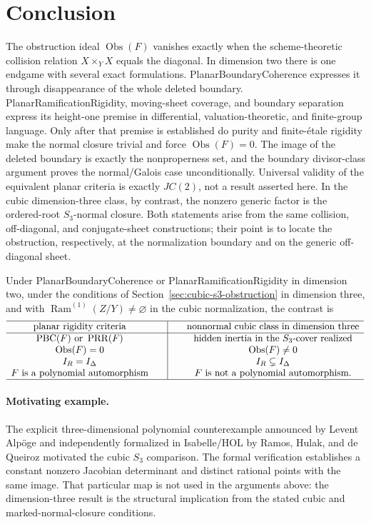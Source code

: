 \documentclass[11pt]{article}
\theoremstyle{remark}
\theoremstyle{definition}
\DeclareMathOperator{\Ram}{Ram}
\newcommand{\Obs}{\operatorname{Obs}}
\begin{document}
\section{Conclusion}
\label{sec:conclusion}

The obstruction ideal \(\Obs(F)\) vanishes exactly when the
scheme-theoretic collision relation \(X\times_YX\) equals the diagonal.
In dimension two there is one endgame with several exact formulations.
PlanarBoundaryCoherence expresses it through disappearance of the whole
deleted boundary.  PlanarRamificationRigidity, moving-sheet coverage, and
boundary separation express its height-one premise in differential,
valuation-theoretic, and finite-group language.  Only after that premise is
established do purity
and finite-\'etale rigidity make the normal closure trivial and force
\(\Obs(F)=0\).  The image of the deleted boundary is exactly the
nonproperness set, and the boundary divisor-class argument proves the
normal/Galois case unconditionally.  Universal validity of the equivalent
planar criteria is exactly \(JC(2)\), not a result asserted here.  In
the cubic dimension-three class, by contrast, the nonzero generic factor is
the ordered-root \(S_3\)-normal closure.
Both statements arise from the same collision, off-diagonal, and
conjugate-sheet constructions; their point is to locate the obstruction,
respectively, at the normalization boundary and on the generic
off-diagonal sheet.

Under PlanarBoundaryCoherence or PlanarRamificationRigidity in dimension
two, under the conditions of Section~\ref{sec:cubic-s3-obstruction} in
dimension three, and with
\(\Ram^{(1)}(Z/Y)\neq\varnothing\) in the cubic normalization, the
contrast is
\[
  \begin{array}{c@{\qquad}|@{\qquad}c}
    \hline
    \text{\rm planar rigidity criteria}
      & \text{\rm nonnormal cubic class in dimension three}\\ \hline
    \operatorname{PBC}(F)\text{\rm\ or }\operatorname{PRR}(F)
      & \text{\rm hidden inertia in the \(S_3\)-cover realized}\\
    \Obs(F)=0 & \Obs(F)\neq0\\
    I_R=I_\Delta & I_R\subsetneq I_\Delta\\
    F\text{\rm\ is a polynomial automorphism}
      & F\text{\rm\ is not a polynomial automorphism}.\\
    \hline
  \end{array}
\]

\paragraph{Motivating example.}
The explicit three-dimensional polynomial counterexample announced by
Levent Alpöge \cite{Alpoge2026} and independently formalized in
Isabelle/HOL by Ramos, Hulak, and de Queiroz
\cite{AFPJacobianCounterexample} motivated the cubic \(S_3\) comparison.
The formal verification establishes a
constant nonzero Jacobian determinant and distinct rational points with
the same image.  That particular map is not used in the arguments above:
the dimension-three result is the structural implication from the
stated cubic and marked-normal-closure conditions.
\end{document}

